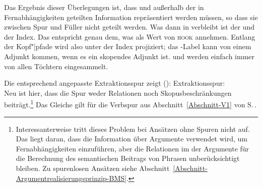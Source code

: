Das Ergebnis dieser Überlegungen ist, dass \rels und \hcons außerhalb der in Fernabhängigkeiten
geteilten Information repräsentiert werden müssen, so dass sie zwischen Spur und Füller nicht
geteilt werden. Was dann in \cont verbleibt ist der \ltopw und der Index. Das entspricht genau dem,
was \citet*[, 307]{CFPS2005a} als Wert von \textsc{hook} annehmen. Entlang der Kopf"|pfade
wird also unter \cont der Index projiziert; das \ltop\hyp Label kann von einem Adjunkt kommen,
wenn es ein skopendes Adjunkt ist. \rels und \hcons werden einfach immer von allen Töchtern eingesammelt.

Die entsprechend angepasste Extraktionsspur zeigt ():
\eas
\label{le-Extraktionsspur2}%
Extraktionsspur: \\
\zs
Neu ist hier, dass die Spur weder Relationen noch Skopusbeschränkungen
beiträgt.\footnote{%
Interessanterweise tritt dieses Problem bei Ansätzen ohne Spuren nicht auf. Das liegt daran, dass
die Information über Argumente verwendet wird, um Fernabhängigkeiten einzuführen, aber die
Relationen im \contw der Argumente für die Berechnung des semantischen Beitrags von Phrasen
unberücksichtigt bleiben. Zu spurenlosen Ansätzen siehe Abschnitt~\ref{Abschnitt-Argumentrealisierungsprinzip-BMS}.}
Das Gleiche gilt für die Verbspur aus Abschnitt~\ref{Abschnitt-V1} von S.\,\pageref{le-verbspur}.

